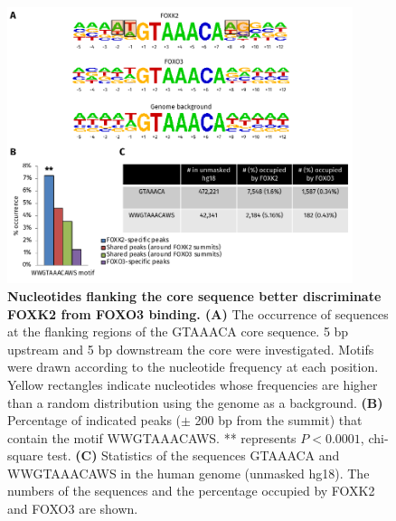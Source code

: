 \begin{figure}[!h]
    \centering
    \includegraphics[width=0.9\textwidth]{chapter3/figures_foxo3/fig46.pdf}
    \caption[Nucleotides flanking the core sequence better discriminate FOXK2 from FOXO3 binding]{\textbf{Nucleotides flanking the core sequence better discriminate FOXK2 from FOXO3 binding. (A)} The occurrence of sequences at the flanking regions of the GTAAACA core sequence. 5 bp upstream and 5 bp downstream the core were investigated. Motifs were drawn according to the nucleotide frequency at each position. Yellow rectangles indicate nucleotides whose frequencies are higher than a random distribution using the genome as a background. \textbf{(B)} Percentage of indicated peaks ($\pm$ 200 bp from the summit) that contain the motif WWGTAAACAWS. ** represents $P<0.0001$, chi-square test. \textbf{(C)} Statistics of the sequences GTAAACA and WWGTAAACAWS in the human genome (unmasked hg18). The numbers of the sequences and the percentage occupied by FOXK2 and FOXO3 are shown.}
    \label{fig:fig46}
\end{figure}

